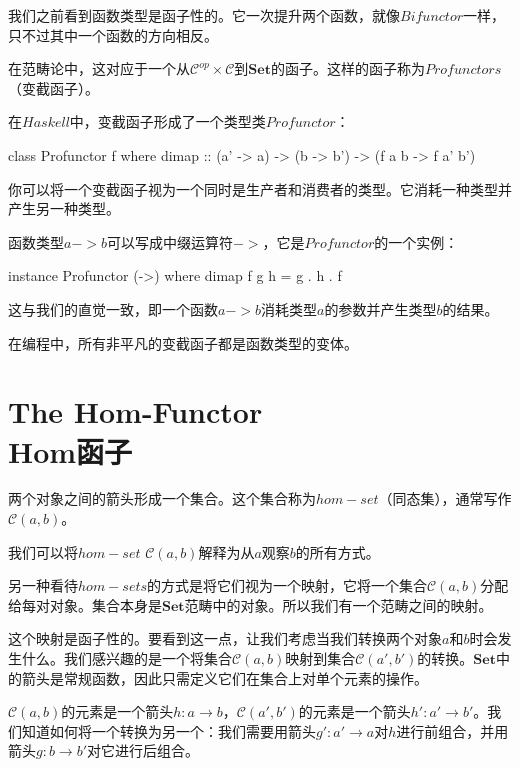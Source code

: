 \documentclass[DaoFP]{subfiles}
\begin{document}
    我们之前看到函数类型是函子性的。它一次提升两个函数，就像$Bifunctor$一样，只不过其中一个函数的方向相反。

    在范畴论中，这对应于一个从$\mathcal{C}^{op} \times \mathcal{C}$到$\mathbf{Set}$的函子。这样的函子称为$Profunctors$（变截函子）。

    在$Haskell$中，变截函子形成了一个类型类$Profunctor$：

    \begin{haskell}
        class Profunctor f where
        dimap :: (a' -> a) -> (b -> b') -> (f a b -> f a' b')
    \end{haskell}

    你可以将一个变截函子视为一个同时是生产者和消费者的类型。它消耗一种类型并产生另一种类型。

    函数类型$a -> b$可以写成中缀运算符$->$，它是$Profunctor$的一个实例：

    \begin{haskell}
        instance Profunctor (->) where
        dimap f g h = g . h . f
    \end{haskell}

    这与我们的直觉一致，即一个函数$a -> b$消耗类型$a$的参数并产生类型$b$的结果。

    在编程中，所有非平凡的变截函子都是函数类型的变体。

    \section{The Hom-Functor\\Hom函子}

    两个对象之间的箭头形成一个集合。这个集合称为$hom-set$（同态集），通常写作$\mathcal{C}(a, b)$。

    我们可以将$hom-set$ $\mathcal{C}(a, b)$解释为从$a$观察$b$的所有方式。

    另一种看待$hom-sets$的方式是将它们视为一个映射，它将一个集合$\mathcal{C}(a, b)$分配给每对对象。集合本身是$\mathbf{Set}$范畴中的对象。所以我们有一个范畴之间的映射。

    这个映射是函子性的。要看到这一点，让我们考虑当我们转换两个对象$a$和$b$时会发生什么。我们感兴趣的是一个将集合$\mathcal{C}(a, b)$映射到集合$\mathcal{C}(a', b')$的转换。$\mathbf{Set}$中的箭头是常规函数，因此只需定义它们在集合上对单个元素的操作。

    $\mathcal{C}(a, b)$的元素是一个箭头$h \colon a \to b$，$\mathcal{C}(a', b')$的元素是一个箭头$h' \colon a' \to b'$。我们知道如何将一个转换为另一个：我们需要用箭头$g' \colon a' \to a$对$h$进行前组合，并用箭头$g \colon b \to b'$对它进行后组合。
\end{document}
